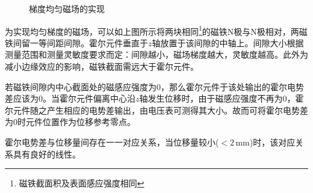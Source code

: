 \documentclass[UTF-8,twoside,cs4size]{ctexart}
\begin{document}
	\begin{figure}[!h]
		\centering
		\caption{梯度均匀磁场的实现}
	\end{figure}
	为实现均匀梯度的磁场，可以如上图所示将两块相同\footnote{磁铁截面积及表面感应强度相同}的磁铁N极与N极相对，两磁铁间留一等间距间隙。霍尔元件垂直于$ z $轴放置于该间隙的中轴上。间隙大小根据测量范围和测量灵敏度要求而定：间隙越小，磁场梯度越大，灵敏度越高。此外为减小边缘效应的影响，磁铁截面需远大于霍尔元件。
	
	若磁铁间隙内中心截面处的磁感应强度为0，那么霍尔元件于该处输出的霍尔电势差应该为0。当霍尔元件偏离中心沿$ z $轴发生位移时，由于磁感应强度不再为0，霍尔元件随之产生相应的电势差输出，由电压表可测得其大小。故而可将霍尔电势差为0时元件位置作为位移参考零点。
	
	霍尔电势差与位移量间存在一一对应关系，当位移量较小($ <2\,\mathrm{mm} $)时，该对应关系具有良好的线性。
	
\end{document}
